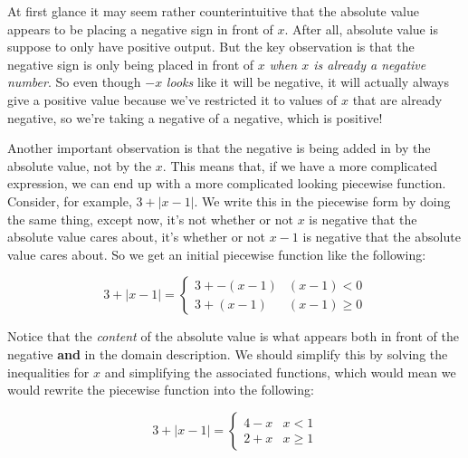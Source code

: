 \documentclass{ximera}
\begin{document}
At first glance it may seem rather counterintuitive that the absolute value appears to be placing a negative sign in front of $x$. After all, absolute value is suppose to only have positive output. But the key observation is that the negative sign is only being placed in front of $x$ \textit{when $x$ is already a negative number}. So even though $-x$ \textit{looks} like it will be negative, it will actually always give a positive value because we've restricted it to values of $x$ that are already negative, so we're taking a negative of a negative, which is positive!

Another important observation is that the negative is being added in by the absolute value, not by the $x$. This means that, if we have a more complicated expression, we can end up with a more complicated looking piecewise function. Consider, for example, $3 + |x - 1|$. We write this in the piecewise form by doing the same thing, except now, it's not whether or not $x$ is negative that the absolute value cares about, it's whether or not $x-1$ is negative that the absolute value cares about. So we get an initial piecewise function like the following:

\[
    3 + |x-1| = 
        \begin{cases}
            3 + -(x-1) & (x-1) < 0 \\
            3 + (x-1) & (x-1) \geq 0
        \end{cases}
\]

Notice that the \textit{content} of the absolute value is what appears both in front of the negative \textbf{and} in the domain description. We should simplify this by solving the inequalities for $x$ and simplifying the associated functions, which would mean we would rewrite the piecewise function into the following:

\[
    3 + |x-1| = 
        \begin{cases}
            4 - x & x < 1 \\
            2 + x & x \geq 1
        \end{cases}
\]
\end{document}

